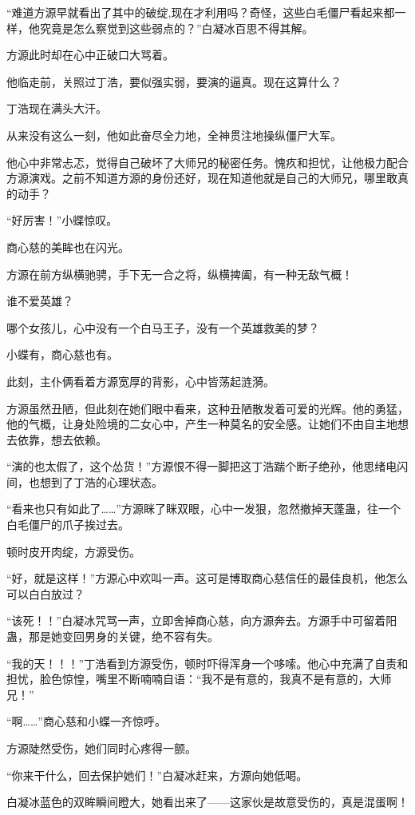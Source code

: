 \begin{this_body}
“难道方源早就看出了其中的破绽,现在才利用吗？奇怪，这些白毛僵尸看起来都一样，他究竟是怎么察觉到这些弱点的？”白凝冰百思不得其解。

方源此时却在心中正破口大骂着。

他临走前，关照过丁浩，要似强实弱，要演的逼真。现在这算什么？

丁浩现在满头大汗。

从来没有这么一刻，他如此奋尽全力地，全神贯注地操纵僵尸大军。

他心中非常忐忑，觉得自己破坏了大师兄的秘密任务。愧疚和担忧，让他极力配合方源演戏。之前不知道方源的身份还好，现在知道他就是自己的大师兄，哪里敢真的动手？

“好厉害！”小蝶惊叹。

商心慈的美眸也在闪光。

方源在前方纵横驰骋，手下无一合之将，纵横捭阖，有一种无敌气概！

谁不爱英雄？

哪个女孩儿，心中没有一个白马王子，没有一个英雄救美的梦？

小蝶有，商心慈也有。

此刻，主仆俩看着方源宽厚的背影，心中皆荡起涟漪。

方源虽然丑陋，但此刻在她们眼中看来，这种丑陋散发着可爱的光辉。他的勇猛，他的气概，让身处险境的二女心中，产生一种莫名的安全感。让她们不由自主地想去依靠，想去依赖。

“演的也太假了，这个怂货！”方源恨不得一脚把这丁浩踹个断子绝孙，他思绪电闪间，也想到了丁浩的心理状态。

“看来也只有如此了……”方源眯了眯双眼，心中一发狠，忽然撤掉天蓬蛊，往一个白毛僵尸的爪子挨过去。

顿时皮开肉绽，方源受伤。

“好，就是这样！”方源心中欢叫一声。这可是博取商心慈信任的最佳良机，他怎么可以白白放过？

“该死！！”白凝冰咒骂一声，立即舍掉商心慈，向方源奔去。方源手中可留着阳蛊，那是她变回男身的关键，绝不容有失。

“我的天！！！”丁浩看到方源受伤，顿时吓得浑身一个哆嗦。他心中充满了自责和担忧，脸色惊惶，嘴里不断喃喃自语：“我不是有意的，我真不是有意的，大师兄！”

“啊……”商心慈和小蝶一齐惊呼。

方源陡然受伤，她们同时心疼得一颤。

“你来干什么，回去保护她们！”白凝冰赶来，方源向她低喝。

白凝冰蓝色的双眸瞬间瞪大，她看出来了——这家伙是故意受伤的，真是混蛋啊！


\end{this_body}
